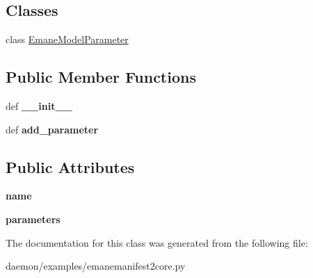 \subsection*{Classes}
\begin{DoxyCompactItemize}
\item 
class \hyperlink{classemanemanifest2core_1_1_emane_manifest2_model_1_1_emane_model_1_1_emane_model_parameter}{Emane\+Model\+Parameter}
\end{DoxyCompactItemize}
\subsection*{Public Member Functions}
\begin{DoxyCompactItemize}
\item 
\hypertarget{classemanemanifest2core_1_1_emane_manifest2_model_1_1_emane_model_abf40a5a20e70a38d4df9d0e46fc5df3b}{def {\bfseries \+\_\+\+\_\+init\+\_\+\+\_\+}}\label{classemanemanifest2core_1_1_emane_manifest2_model_1_1_emane_model_abf40a5a20e70a38d4df9d0e46fc5df3b}

\item 
\hypertarget{classemanemanifest2core_1_1_emane_manifest2_model_1_1_emane_model_aca3a8b55028e39048e835ffdca9e678d}{def {\bfseries add\+\_\+parameter}}\label{classemanemanifest2core_1_1_emane_manifest2_model_1_1_emane_model_aca3a8b55028e39048e835ffdca9e678d}

\end{DoxyCompactItemize}
\subsection*{Public Attributes}
\begin{DoxyCompactItemize}
\item 
\hypertarget{classemanemanifest2core_1_1_emane_manifest2_model_1_1_emane_model_a3189250af0d57f7926f3bcc45c2686c9}{{\bfseries name}}\label{classemanemanifest2core_1_1_emane_manifest2_model_1_1_emane_model_a3189250af0d57f7926f3bcc45c2686c9}

\item 
\hypertarget{classemanemanifest2core_1_1_emane_manifest2_model_1_1_emane_model_a2b522f7d6bc0741add08e040bf94469c}{{\bfseries parameters}}\label{classemanemanifest2core_1_1_emane_manifest2_model_1_1_emane_model_a2b522f7d6bc0741add08e040bf94469c}

\end{DoxyCompactItemize}


The documentation for this class was generated from the following file\+:\begin{DoxyCompactItemize}
\item 
daemon/examples/emanemanifest2core.\+py\end{DoxyCompactItemize}
